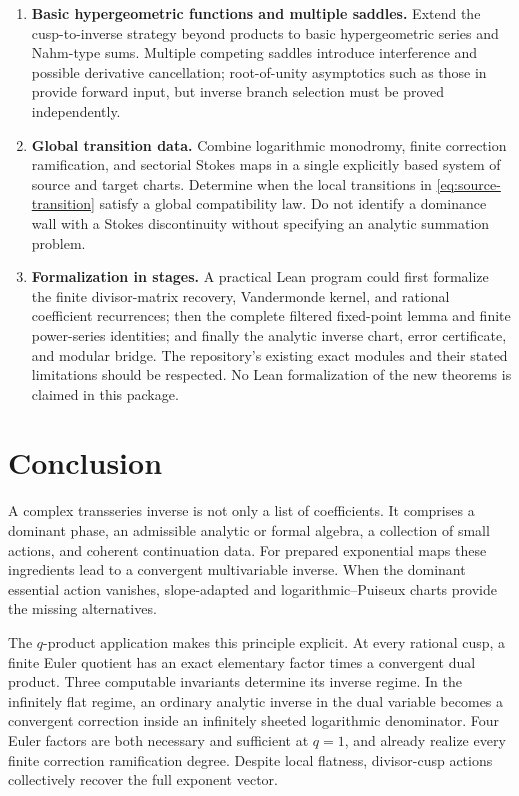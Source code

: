 \documentclass[11pt,a4paper]{article}
\numberwithin{equation}{section}
\theoremstyle{definition}\newtheorem{definition}[theorem]{Definition}
\theoremstyle{remark}\newtheorem{remark}[theorem]{Remark}
\begin{document}
\begin{enumerate}[label=\textbf{R\arabic*.},leftmargin=14mm]
\item \textbf{Basic hypergeometric functions and multiple saddles.}
Extend the cusp-to-inverse strategy beyond products to basic
hypergeometric series and Nahm-type sums. Multiple competing saddles
introduce interference and possible derivative cancellation; root-of-unity
asymptotics such as those in \cite{gz} provide forward input, but inverse
branch selection must be proved independently.

\item \textbf{Global transition data.}
Combine logarithmic monodromy, finite correction ramification, and
sectorial Stokes maps in a single explicitly based system of source and
target charts. Determine when the local transitions in
\eqref{eq:source-transition} satisfy a global compatibility law. Do not
identify a dominance wall with a Stokes discontinuity without specifying
an analytic summation problem.

\item \textbf{Formalization in stages.}
A practical Lean program could first formalize the finite divisor-matrix
recovery, Vandermonde kernel, and rational coefficient recurrences; then
the complete filtered fixed-point lemma and finite power-series
identities; and finally the analytic inverse chart, error certificate,
and modular bridge. The repository's existing exact modules and their
stated limitations should be respected. No Lean formalization of the
new theorems is claimed in this package.
\end{enumerate}

\section{Conclusion}
A complex transseries inverse is not only a list of coefficients. It
comprises a dominant phase, an admissible analytic or formal algebra,
a collection of small actions, and coherent continuation data. For
prepared exponential maps these ingredients lead to a convergent
multivariable inverse. When the dominant essential action vanishes,
slope-adapted and logarithmic--Puiseux charts provide the missing
alternatives.

The $q$-product application makes this principle explicit. At every
rational cusp, a finite Euler quotient has an exact elementary factor
times a convergent dual product. Three computable invariants determine
its inverse regime. In the infinitely flat regime, an ordinary analytic
inverse in the dual variable becomes a convergent correction inside an
infinitely sheeted logarithmic denominator. Four Euler factors are both
necessary and sufficient at $q=1$, and already realize every finite
correction ramification degree. Despite local flatness, divisor-cusp
actions collectively recover the full exponent vector.
\end{document}
